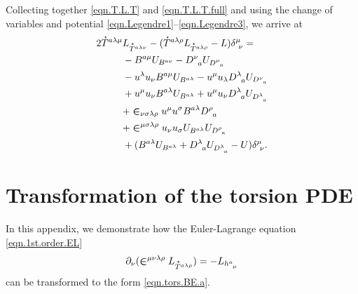 \documentclass[
10pt, %
a4paper, %
oneside, %
twocolumn,
headinclude,footinclude, %
BCOR5mm, %
]{scrartcl}
\newcommand{\tetrsymbol}{h}
\newcommand{\tetr}[2]{\tetrsymbol^{#1}_{\phantom{#1}#2}}
\newcommand{\D}[1]{\partial_{#1}} %
\newcommand{\Dm}[2]{D_{\phantom{#2}#1}^{#2}}	%
\newcommand{\Bm}[2]{B^{#1#2}}	%
\newcommand{\Laghodge}{L}%
\newcommand{\Um}{U}%
\newcommand{\LCsymb}{\bm{\in}}    %
\newcommand{\HDT}[1]{\accentset{\star}{T}^{#1}}
\newcommand{\KD}[2]{\delta^{#1}_{\ #2}}
\newcommand{\projector}[2]{\Delta^{#1}_{\ #2}}
\begin{document}
	Collecting together \eqref{eqn.T.L.T} and \eqref{eqn.T.L.T.full} and using the change of 
	variables and potential \eqref{eqn.Legendre1}--\eqref{eqn.Legendre3}, we arrive at
	\begin{align}\label{eqn.Sigma.tors.part}
		2 \HDT{a\lambda\mu}&L_{\HDT{a\lambda\nu}} - 
		(\HDT{a\lambda\rho}L_{\HDT{a\lambda\rho}} - L) \KD{\mu}{\nu} = \nonumber\\
		& - \Bm{a}{\mu}\Um_{\Bm{a}{\nu}} - \Dm{a}{\nu}\Um_{\Dm{a}{\mu}} \nonumber\\
		& - u^\lambda u_\nu \Bm{a}{\mu} \Um_{\Bm{a}{\lambda}} - u^\mu u_\lambda \Dm{a}{\lambda} 
		\Um_{\Dm{a}{\nu}}				\nonumber\\
		& + u^\mu u_\nu \Bm{a}{\lambda} \Um_{\Bm{a}{\lambda}} 
		+ u^\mu u_\nu \Dm{a}{\lambda} \Um_{\Dm{a}{\lambda}}
		\nonumber \\
		& + \LCsymb_{\nu\sigma\lambda\rho} u^\mu u^\sigma \Bm{a}{\lambda} \Dm{a}{\rho} 
		\nonumber\\
		& + \LCsymb^{\mu\sigma\lambda\rho} u_\nu u_\sigma \Um_{\Bm{a}{\lambda}} 
		\Um_{\Dm{a}{\rho}} 
		\nonumber \\
		& + (\Bm{a}{\lambda} \Um_{\Bm{a}{\lambda}} + \Dm{a}{\lambda} \Um_{\Dm{a}{\lambda}} - 
		\Um) \KD{\mu}{\nu}.
	\end{align}
	
	
	
	
	
	
	
	\section{Transformation of the torsion PDE}\label{app.sec.Deqn}
	
	
	In this appendix, we demonstrate how the Euler-Lagrange equation \eqref{eqn.1st.order.EL} 
	\begin{equation}\label{eqn.EL.tors}
		\D{\nu}(\LCsymb^{\mu\nu\lambda\rho}\Laghodge_{\HDT{a\lambda\rho}}) 
		=-\Laghodge_{\tetr{a}{\mu}}
	\end{equation}
	can be 
	transformed to the form \eqref{eqn.tors.BE.a}.
	
\end{document}
